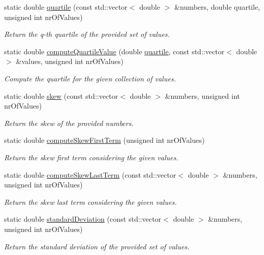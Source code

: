 \begin{DoxyCompactItemize}
static double \hyperlink{classmultiscale_1_1Numeric_ae00445066d24b46353bfb648a2588a99}{quartile} (const std\-::vector$<$ double $>$ \&numbers, double quartile, unsigned int nr\-Of\-Values)
\begin{DoxyCompactList}\small\item\em Return the q-\/th quartile of the provided set of values. \end{DoxyCompactList}\item 
static double \hyperlink{classmultiscale_1_1Numeric_ae118c440002c4692a72f03e5c9351727}{compute\-Quartile\-Value} (double \hyperlink{classmultiscale_1_1Numeric_a127a2b3e5e659b4e493767ba23fc45da}{quartile}, const std\-::vector$<$ double $>$ \&values, unsigned int nr\-Of\-Values)
\begin{DoxyCompactList}\small\item\em Compute the quartile for the given collection of values. \end{DoxyCompactList}\item 
static double \hyperlink{classmultiscale_1_1Numeric_a8a3a60e7d5c595e42d766963430ad779}{skew} (const std\-::vector$<$ double $>$ \&numbers, unsigned int nr\-Of\-Values)
\begin{DoxyCompactList}\small\item\em Return the skew of the provided numbers. \end{DoxyCompactList}\item 
static double \hyperlink{classmultiscale_1_1Numeric_a97ce6f56c4d8af4769d4966ebab72836}{compute\-Skew\-First\-Term} (unsigned int nr\-Of\-Values)
\begin{DoxyCompactList}\small\item\em Return the skew first term considering the given values. \end{DoxyCompactList}\item 
static double \hyperlink{classmultiscale_1_1Numeric_a11a1f0d5404dbc729b22df32b4178ba3}{compute\-Skew\-Last\-Term} (const std\-::vector$<$ double $>$ \&numbers, unsigned int nr\-Of\-Values)
\begin{DoxyCompactList}\small\item\em Return the skew last term considering the given values. \end{DoxyCompactList}\item 
static double \hyperlink{classmultiscale_1_1Numeric_a8b82f2167d4687c5f4124a5cb1df8e51}{standard\-Deviation} (const std\-::vector$<$ double $>$ \&numbers, unsigned int nr\-Of\-Values)
\begin{DoxyCompactList}\small\item\em Return the standard deviation of the provided set of values. \end{DoxyCompactList}\item 

\end{DoxyCompactItemize}

